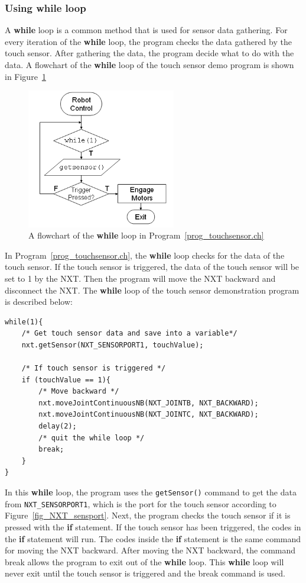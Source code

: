 \documentclass[11pt]{article}
\begin{document}
\subsubsection*{Using while loop}
A {\bf while} loop is a common method that is used for sensor data gathering. 
For every iteration of the {\bf while} loop, the program checks the data 
gathered by the touch sensor. After gathering the data, the program decide what 
to do with the data. A flowchart of the {\bf while} loop of the touch sensor 
demo program is shown in Figure~\ref{fig_NXT_touchflow}\\
\begin{figure}[h]
  \begin{center}
    \includegraphics[height=2.4in]{figure/mindstorm/NXT_touchflow.png}
    \caption{A flowchart of the {\bf while} loop in Program~\ref{prog_touchsensor.ch}
    \label{fig_NXT_touchflow}}
  \end{center}
\end{figure}
In Program~\ref{prog_touchsensor.ch}, the {\bf while} loop checks for the data 
of the touch sensor. If the touch sensor is triggered, the data of the touch 
sensor will be set to 1 by the NXT. Then the program will move the NXT backward 
and disconnect the NXT. The {\bf while} loop of the touch sensor demonstration 
program is described below:
\begin{lstlisting}
while(1){
    /* Get touch sensor data and save into a variable*/
    nxt.getSensor(NXT_SENSORPORT1, touchValue);
    
    /* If touch sensor is triggered */
    if (touchValue == 1){
        /* Move backward */
        nxt.moveJointContinuousNB(NXT_JOINTB, NXT_BACKWARD);
        nxt.moveJointContinuousNB(NXT_JOINTC, NXT_BACKWARD);
        delay(2);
        /* quit the while loop */
        break;
    }
}
\end{lstlisting}
In this {\bf while} loop, the program uses the {\tt getSensor()} command to get 
the data from {\tt NXT\_SENSORPORT1}, which is the port for the touch sensor 
according to Figure~\ref{fig_NXT_sensport}. Next, the program checks the touch 
sensor if it is pressed with the {\bf if} statement. If the touch sensor has been 
triggered, the codes in the {\bf if} statement will run. The codes inside the 
{\bf if} statement is the same command for moving the NXT backward. After moving 
the NXT backward, the command break allows the program to exit out of the 
{\bf while} loop. This {\bf while} loop will never exit until the touch sensor 
is triggered and the break command is used.
\end{document}
